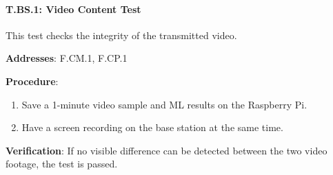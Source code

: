 \paragraph{T.BS.1: Video Content Test}

This test checks the integrity of the transmitted video.

\textbf{Addresses}: F.CM.1, F.CP.1

\textbf{Procedure}:
\begin{enumerate}[noitemsep]
    \item Save a 1-minute video sample and ML results on the Raspberry Pi.
    \item Have a screen recording on the base station at the same time.
\end{enumerate}

\textbf{Verification}: 
If no visible difference can be detected between the two video footage, the test is passed.